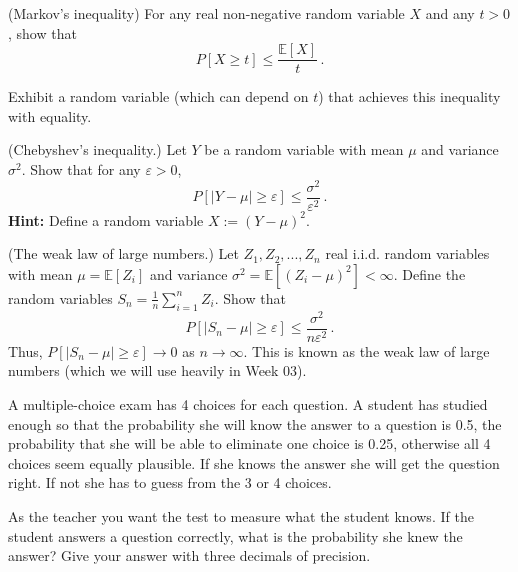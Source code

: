 \documentclass[a4paper,10pt,landscape,twocolumn]{scrartcl}
\begin{document}
\begin{exercise}
	\begin{subex}[(2pt)] (Markov's inequality) For any real non-negative random variable $X$ and any $t > 0$, show that
	\[
	P[X \geq t] \leq \frac{\mathbb{E}[X]}{t}\, .
	\]
\end{subex}
\begin{subex}[(1pt)]
	Exhibit a random variable (which can depend on $t$) that achieves this inequality with equality.
	\end{subex}

	\begin{subex}[(3pt)] (Chebyshev's inequality.) Let $Y$ be a random variable with mean $\mu$ and variance $\sigma^2$. Show that for any $\varepsilon > 0$,
	\[
	P[|Y - \mu| \geq \varepsilon] \leq \frac{\sigma^2}{\varepsilon^2} \, .
	\]
	\textbf{Hint:} Define a random variable $X := (Y - \mu)^2$.
	\end{subex}
	\begin{subex}[(3pt)] (The weak law of large numbers.) Let $Z_1, Z_2, ..., Z_n$ real i.i.d. random variables with mean $\mu = \mathbb{E}[Z_i]$ and variance $\sigma^2 = \mathbb{E}[(Z_i - \mu)^2] < \infty$. Define the random variables $S_n = \frac{1}{n} \sum_{i=1}^n Z_i$. Show that
	\[
	P[|S_n - \mu | \geq \varepsilon] \leq \frac{\sigma^2}{n\varepsilon^2}\, .
	\]
	Thus, $P[|S_n - \mu| \geq \varepsilon] \to 0$ as $n \to \infty$. This is known as the weak law of large numbers (which we will use heavily in Week 03).
	\end{subex}
\end{exercise}

 \begin{exercise}
 A multiple-choice exam has 4 choices for each question. A student has studied enough so that the probability she will know the answer to a question is 0.5, the probability that she will be able to eliminate one choice is 0.25, otherwise all 4 choices seem equally plausible. If she knows the answer she will get the question right. If not she has to guess from the 3 or 4 choices.
 
 As the teacher you want the test to measure what the student knows. If the student answers a question correctly, what is the probability she knew the answer? Give your answer with three decimals of precision.
 \end{exercise}

\end{document}

